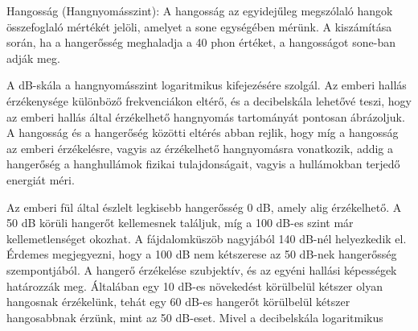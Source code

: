 Hangosság (Hangnyomásszint):
A hangosság az egyidejűleg megszólaló hangok összefoglaló mértékét jelöli, amelyet a sone egységében mérünk. 
A kiszámítása során, ha a hangerősség meghaladja a 40 phon értéket, a hangosságot sone-ban adják meg.

A dB-skála a hangnyomásszint logaritmikus kifejezésére szolgál. Az emberi hallás érzékenysége különböző 
frekvenciákon eltérő, és a decibelskála lehetővé teszi, hogy az emberi hallás által 
érzékelhető hangnyomás tartományát pontosan ábrázoljuk.
A hangosság és a hangerőség közötti eltérés abban rejlik, hogy míg a hangosság az emberi érzékelésre, 
vagyis az érzékelhető hangnyomásra vonatkozik, addig a hangerőség a hanghullámok 
fizikai tulajdonságait, vagyis a hullámokban terjedő energiát méri.

Az emberi fül által észlelt legkisebb hangerősség 0 dB, amely alig érzékelhető. 
A 50 dB körüli hangerőt kellemesnek találjuk, míg a 100 dB-es szint már kellemetlenséget 
okozhat. A fájdalomküszöb nagyjából 140 dB-nél helyezkedik el. Érdemes megjegyezni, hogy 
a 100 dB nem kétszerese az 50 dB-nek hangerősség szempontjából. A hangerő érzékelése 
szubjektív, és az egyéni hallási képességek határozzák meg. Általában egy 10 dB-es 
növekedést körülbelül kétszer olyan hangosnak érzékelünk, tehát egy 60 dB-es hangerőt 
körülbelül kétszer hangosabbnak érzünk, mint az 50 dB-eset. Mivel a decibelskála logaritmikus 
